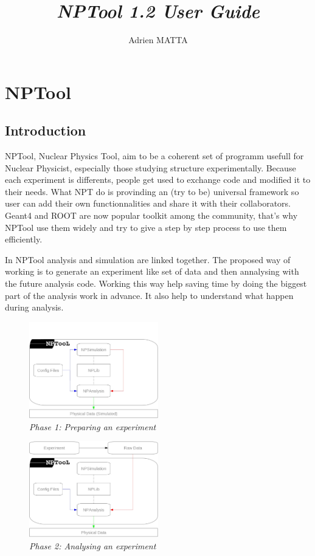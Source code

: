 \documentclass{book}
\begin{document}
\title{\emph{NPTool 1.2 User Guide}}
\author{Adrien MATTA}

\maketitle 
\pagebreak
\tableofcontents %
\pagebreak

\chapter[NPTool]{NPTool}
\section {Introduction}

NPTool, Nuclear Physics Tool, aim to be a coherent set of programm usefull for Nuclear Physicist, especially those studying structure experimentally. 
Because each experiment is differents, people get used to exchange code and modified it to their needs. 
What NPT do is provinding an (try to be) universal framework so user can add their own functionnalities and share it with their collaborators. 
Geant4 and ROOT are now popular toolkit among the community, that's why NPTool use them widely and try to give a step by step process to use them efficiently.

In NPTool analysis and simulation are linked together. 
The proposed way of working is to generate an experiment like set of data and then annalysing with the future analysis code. 
Working this way help saving time by doing the biggest part of the analysis work in advance. 
It also help to understand what happen during analysis. 

				\begin{figure}[!htbp]
					\centering
					\includegraphics[width=0.5\textwidth]{./pictures/nptool_scheme_Sim.png}
					\caption{ \emph{Phase 1: Preparing an experiment} }
				\end{figure}

				\begin{figure}[!htbp]
					\centering
					\includegraphics[width=0.5\textwidth]{./pictures/nptool_scheme_Ana.png}
					\caption{ \emph{Phase 2: Analysing an experiment} }
				\end{figure}	
				
\end{document}
